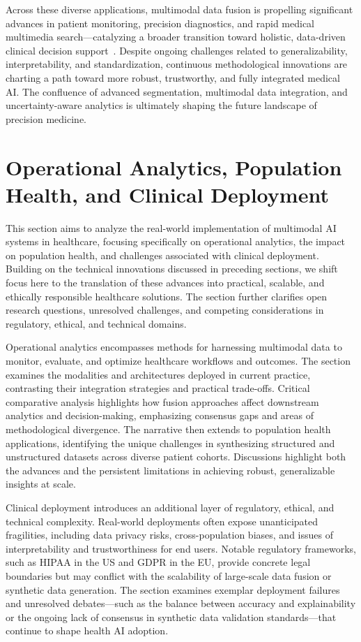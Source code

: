 \documentclass[sigconf]{acmart}
\begin{document}
Across these diverse applications, multimodal data fusion is propelling significant advances in patient monitoring, precision diagnostics, and rapid medical multimedia search—catalyzing a broader transition toward holistic, data-driven clinical decision support~\cite{ref41,ref42,ref50,ref61,ref65,ref70,ref71,ref86,ref89,ref90,ref104,ref105}. Despite ongoing challenges related to generalizability, interpretability, and standardization, continuous methodological innovations are charting a path toward more robust, trustworthy, and fully integrated medical AI. The confluence of advanced segmentation, multimodal data integration, and uncertainty-aware analytics is ultimately shaping the future landscape of precision medicine.

\section{Operational Analytics, Population Health, and Clinical Deployment}

This section aims to analyze the real-world implementation of multimodal AI systems in healthcare, focusing specifically on operational analytics, the impact on population health, and challenges associated with clinical deployment. Building on the technical innovations discussed in preceding sections, we shift focus here to the translation of these advances into practical, scalable, and ethically responsible healthcare solutions. The section further clarifies open research questions, unresolved challenges, and competing considerations in regulatory, ethical, and technical domains.

Operational analytics encompasses methods for harnessing multimodal data to monitor, evaluate, and optimize healthcare workflows and outcomes. The section examines the modalities and architectures deployed in current practice, contrasting their integration strategies and practical trade-offs. Critical comparative analysis highlights how fusion approaches affect downstream analytics and decision-making, emphasizing consensus gaps and areas of methodological divergence. The narrative then extends to population health applications, identifying the unique challenges in synthesizing structured and unstructured datasets across diverse patient cohorts. Discussions highlight both the advances and the persistent limitations in achieving robust, generalizable insights at scale.

Clinical deployment introduces an additional layer of regulatory, ethical, and technical complexity. Real-world deployments often expose unanticipated fragilities, including data privacy risks, cross-population biases, and issues of interpretability and trustworthiness for end users. Notable regulatory frameworks, such as HIPAA in the US and GDPR in the EU, provide concrete legal boundaries but may conflict with the scalability of large-scale data fusion or synthetic data generation. The section examines exemplar deployment failures and unresolved debates—such as the balance between accuracy and explainability or the ongoing lack of consensus in synthetic data validation standards—that continue to shape health AI adoption.
\end{document}
